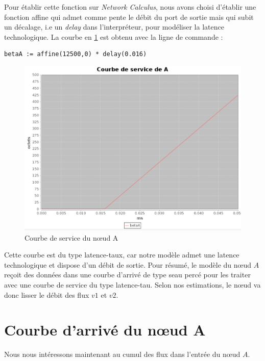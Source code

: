 Pour établir cette fonction sur \emph{Network Calculus}, nous avons choisi d'établir une fonction affine qui admet comme pente le débit du port de sortie mais qui subit un décalage, i.e un \emph{delay} dans l'interpréteur, pour modéliser la latence technologique. La courbe en \ref{fig:serviceA} est obtenu avec la ligne de commande :
\begin{verbatim}
betaA := affine(12500,0) * delay(0.016) 
\end{verbatim}
\begin{figure}[!ht]\label{fig:serviceA}
\centering
\includegraphics[width = .5\textwidth]{./I/images/beta_A.png}
\caption{Courbe de service du nœud A}
\end{figure} 

Cette courbe est du type latence-taux, car notre modèle admet une latence technologique et dispose d'un débit de sortie. Pour résumé, le modèle du nœud $A$ reçoit des données dans une courbe d'arrivé de type seau percé pour les traiter avec une courbe de service du type latence-tau. Selon nos estimations, le nœud va donc lisser le débit des flux $v1$ et $v2$.

\section{Courbe d'arrivé du nœud A}
Nous nous intéressons maintenant au cumul des flux dans l'entrée du nœud $A$.